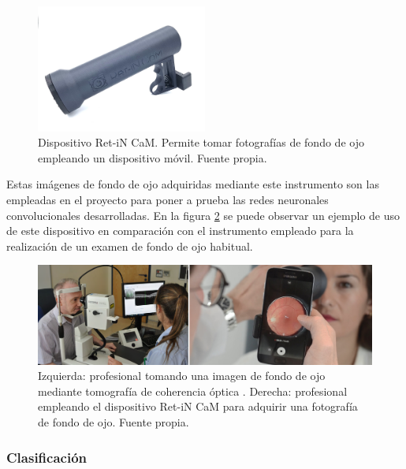\begin{figure}[h]
    \centering
    \includegraphics[width=0.5\textwidth]{img/retincam dispositivo.jpg}
    \caption{Dispositivo Ret-iN CaM. Permite tomar fotografías de fondo de ojo empleando un dispositivo móvil. Fuente propia.}
    \label{fig:retincam_dispositivo}
\end{figure}

Estas imágenes de fondo de ojo adquiridas mediante este instrumento son las empleadas en el proyecto para poner a prueba las redes neuronales convolucionales desarrolladas. En la figura \ref{fig:retincam_oct} se puede observar un ejemplo de uso de este dispositivo en comparación con el instrumento empleado para la realización de un examen de fondo de ojo habitual.

\begin{figure}[h]
    \centering
    \includegraphics[width=1\textwidth]{img/retincam_oct.png}
    \caption{Izquierda: profesional tomando una imagen de fondo de ojo mediante tomografía de coherencia óptica \cite{retino:OMS}. Derecha: profesional empleando el dispositivo Ret-iN CaM para adquirir una fotografía de fondo de ojo. Fuente propia.}
    \label{fig:retincam_oct}
\end{figure}

\titlespacing{\subsubsection}{0pt}{0.25cm}{0.1cm}
\subsubsection{Clasificación}

